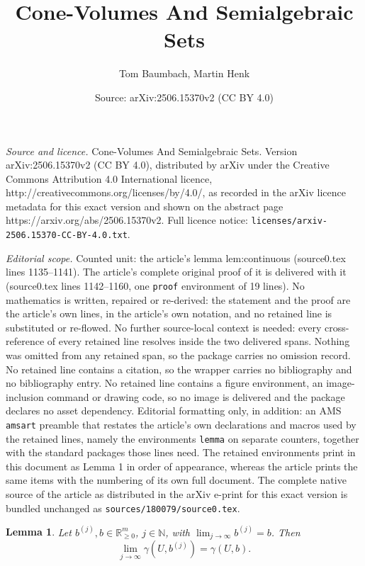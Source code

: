 \documentclass[10pt,a4paper]{amsart}
\title{Cone-Volumes And Semialgebraic Sets}
\author{Tom Baumbach, Martin Henk}
\date{Source: arXiv:2506.15370v2 (CC BY 4.0)}
\newtheorem{lemma}{Lemma}
\newcommand{\N}{\mathbb{N}}
\newcommand{\R}{\mathbb{R}}
\begin{document}
\maketitle

\noindent\emph{Source and licence.} Cone-Volumes And Semialgebraic Sets. Version arXiv:2506.15370v2 (CC BY 4.0), distributed by arXiv under the Creative Commons Attribution 4.0 International licence, http://creativecommons.org/licenses/by/4.0/, as recorded in the arXiv licence metadata for this exact version and shown on the abstract page https://arxiv.org/abs/2506.15370v2. Full licence notice: \texttt{licenses/arxiv-2506.15370-CC-BY-4.0.txt}.\par\smallskip

\noindent\textit{Editorial scope.} Counted unit: the article's lemma lem:continuous (source0.tex lines 1135--1141). The article's complete original proof of it is delivered with it (source0.tex lines 1142--1160, one \texttt{proof} environment of 19 lines). No mathematics is written, repaired or re-derived: the statement and the proof are the article's own lines, in the article's own notation, and no retained line is substituted or re-flowed.  No further source-local context is needed: every cross-reference of every retained line resolves inside the two delivered spans.  Nothing was omitted from any retained span, so the package carries no omission record.  No retained line contains a citation, so the wrapper carries no bibliography and no bibliography entry.  No retained line contains a figure environment, an image-inclusion command or drawing code, so no image is delivered and the package declares no asset dependency.  Editorial formatting only, in addition: an AMS \texttt{amsart} preamble that restates the article's own declarations and macros used by the retained lines, namely the environments \texttt{lemma} on separate counters, together with the standard packages those lines need.  The retained environments print in this document as Lemma 1 in order of appearance, whereas the article prints the same items with the numbering of its own full document.  The complete native source of the article as distributed in the arXiv e-print for this exact version is bundled unchanged as \texttt{sources/180079/source0.tex}.
\begin{lemma} Let $b^{(j)},b\in\R^m_{\geq 0}$, $j\in\N$,  with
  $\lim_{j\to\infty} b^{(j)} = b$. Then
  \begin{equation*}
    \lim_{j\to\infty} \gamma(U,b^{(j)})= \gamma(U,b).
  \end{equation*}
\label{lem:continuous}
\end{lemma}
\end{document}
